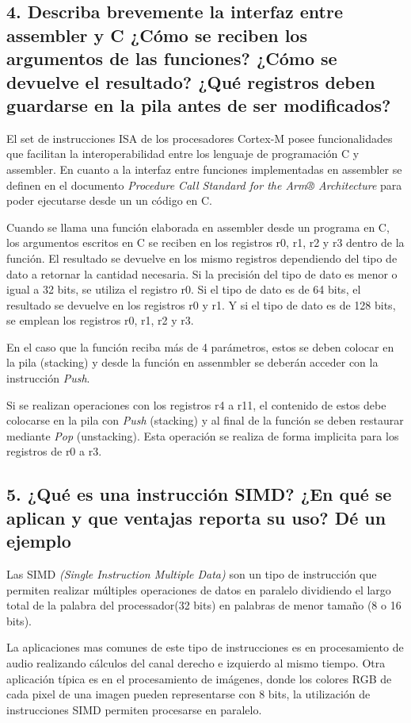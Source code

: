 \documentclass[10pt,a4paper,twoside,spanish]{article}	%
\begin{document}
\subsection*{4. Describa brevemente la interfaz entre assembler y C ¿Cómo se reciben los argumentos de las funciones? ¿Cómo se devuelve el resultado? ¿Qué registros deben guardarse en la pila antes de ser modificados?}

El set de instrucciones ISA de los procesadores Cortex-M posee funcionalidades que facilitan la 
interoperabilidad entre los lenguaje de programación C y assembler. En cuanto a la interfaz entre funciones implementadas en assembler se definen en el documento \textit{Procedure Call Standard for the Arm® Architecture} para poder ejecutarse desde un un código en C.

Cuando se llama una función elaborada en assembler desde un programa en C, los argumentos escritos en C se reciben en los registros r0, r1, r2 y r3 dentro de la función. El resultado se devuelve en los mismo registros dependiendo del tipo de dato a retornar la cantidad necesaria. Si la precisión del tipo de dato es menor o igual a 32 bits, se utiliza el registro r0. Si el tipo de dato es de 64 bits, el resultado se devuelve en los registros r0 y r1. Y si el tipo de dato es de 128 bits, se emplean los registros r0, r1, r2 y r3.

En el caso que la función reciba más de 4 parámetros, estos se deben  colocar en la pila (stacking) y desde la función en assenmbler se deberán acceder con la instrucción \textit{Push}.

Si se realizan operaciones con los registros r4 a r11, el contenido de estos debe colocarse en la pila con \textit{Push} (stacking) y al final de la  función se deben restaurar mediante \textit{Pop} (unstacking). Esta operación se realiza de forma implicita para los registros de r0 a r3.


\subsection*{5. ¿Qué es una instrucción SIMD? ¿En qué se aplican y que ventajas reporta su uso? Dé un ejemplo}

Las SIMD \textit{(Single Instruction Multiple Data)} son un tipo de instrucción que permiten realizar múltiples operaciones de datos en paralelo dividiendo el largo total de la palabra del processador(32 bits) en palabras de menor tamaño (8 o 16 bits).

La aplicaciones mas comunes de este tipo de instrucciones es en procesamiento de audio realizando cálculos del canal derecho e izquierdo al mismo tiempo. Otra aplicación típica es en el procesamiento de imágenes, donde los colores RGB de cada pixel de una imagen pueden representarse con 8 bits, la utilización de instrucciones SIMD permiten procesarse en paralelo.
\end{document}
